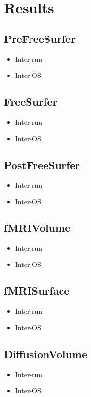 \chapter{Results}


\section{PreFreeSurfer}
  \begin{itemize}
    \item Inter-run
    \item Inter-OS
  \end{itemize}
  
\section{FreeSurfer}
\begin{itemize}
    \item Inter-run
    \item Inter-OS
  \end{itemize}
  
\section{PostFreeSurfer}
\begin{itemize}
    \item Inter-run
    \item Inter-OS
  \end{itemize}
  
\section{fMRIVolume}
\begin{itemize}
    \item Inter-run
    \item Inter-OS
  \end{itemize}
  
\section{fMRISurface}
\begin{itemize}
    \item Inter-run
    \item Inter-OS
  \end{itemize}
  
\section{DiffusionVolume}
\begin{itemize}
    \item Inter-run
    \item Inter-OS
  \end{itemize}

